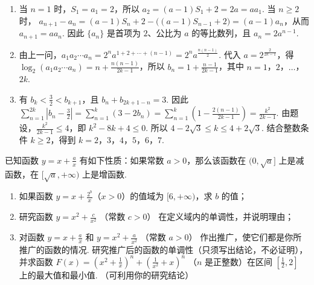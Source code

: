 \begin{solution}
\begin{enumerate}
\item 当 \(n=1\) 时，\(S_1=a_1=2\)，所以 \(a_2=(a-1)S_1+2=2a=aa_1\). 当 \(n\geq2\) 时，
\(a_{n+1}-a_n=(a-1)S_n+2-\bigl((a-1)S_{n-1}+2\bigr)=(a-1)a_n\)，从而 \(a_{n+1}=aa_n\). 因此 \(\{a_n\}\) 是首项为 \(2\)、公比为 \(a\) 的等比数列，且 \(a_n=2a^{n-1}\).
\item 由上一问，\(a_1a_2\cdots a_n=2^n a^{1+2+\cdots+(n-1)}=2^n a^{\frac{n(n-1)}{2}}\). 代入 \(a=2^{\frac{2}{2k-1}}\)，得
\(\log_2(a_1a_2\cdots a_n)=n+\frac{n(n-1)}{2k-1}\)，所以
\(b_n=1+\frac{n-1}{2k-1}\)，其中 \(n=1\)，\(2\)，\(\ldots\)，\(2k\).
\item 有 \(b_k<\frac{3}{2}<b_{k+1}\)，且
\(b_n+b_{2k+1-n}=3\). 因此
\(\displaystyle \sum_{n=1}^{2k}\left|b_n-\frac{3}{2}\right|=\sum_{n=1}^{k}\left(3-2b_n\right)=\sum_{n=1}^{k}\left(1-\frac{2(n-1)}{2k-1}\right)=\frac{k^2}{2k-1}\).
由题设，\(\frac{k^2}{2k-1}\leq4\)，即 \(k^2-8k+4\leq0\). 所以 \(4-2\sqrt{3}\leq k\leq4+2\sqrt{3}\). 结合整数条件 \(k\geq2\)，得到 \(k=2\)，\(3\)，\(4\)，\(5\)，\(6\)，\(7\).
\end{enumerate}
\end{solution}

\begin{problem}
已知函数 \( y = x + \frac{a}{x} \) 有如下性质：如果常数 \( a > 0 \)，那么该函数在 \((0, \sqrt{a}]\) 上是减函数，在 \([\sqrt{a}, +\infty)\) 上是增函数.

\begin{enumerate}
\item 如果函数 \( y = x + \frac{2^{b}}{x} \)（\(x > 0\)）的值域为 \([6, +\infty)\)，求 \( b \) 的值；
\item 研究函数 \( y = x^{2} + \frac{c}{x^{2}} \) （常数 \( c > 0 \)） 在定义域内的单调性，并说明理由；
\item 对函数 \( y = x + \frac{a}{x} \) 和 \( y = x^{2} + \frac{a}{x^{2}} \) （常数 \( a > 0 \)） 作出推广，使它们都是你所推广的函数的情况. 研究推广后的函数的单调性（只须写出结论，不必证明），并求函数 \( F(x) = \left(x^{2} + \frac{1}{x}\right)^{n} + \left(\frac{1}{x^{2}} + x\right)^{n} \) （\( n \) 是正整数）在区间 \( \left[\frac{1}{2}, 2\right] \) 上的最大值和最小值. （可利用你的研究结论）
\end{enumerate}
\end{problem}

